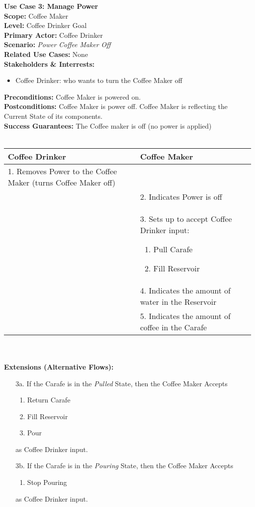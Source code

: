 \documentclass[letterpaper]{article}
\begin{document}
\noindent
\textbf{Use Case 3: Manage Power}\\
\textbf{Scope:  }Coffee Maker\\
\textbf{Level:  }Coffee Drinker Goal\\
\textbf{Primary Actor:  }Coffee Drinker\\
\textbf{Scenario:  }\textit{Power Coffee Maker Off}\\
\textbf{Related Use Cases:  }None\\
\textbf{Stakeholders \& Interrests:  }
\begin{itemize}
\item Coffee Drinker:  who wants to turn the Coffee Maker off
\end{itemize}
\textbf{Preconditions:  }Coffee Maker is powered on.\\
\textbf{Postconditions:  }Coffee Maker is power off.  Coffee Maker is
reflecting the Current State of its components.\\
\textbf{Success Guarantees:  }The Coffee maker is off (no power is
applied)\\\\
\begin{tabular}{|p{5.75cm}|p{5.75cm}|}\hline
\textbf{Coffee Drinker} & \textbf{Coffee Maker}\\\hline
1.  Removes Power to the Coffee Maker (turns Coffee Maker off) &
    \\\hline
& 2.  Indicates Power is off\\\hline
& 3.  Sets up to accept Coffee Drinker input: 
\begin{enumerate}
\item Pull Carafe
\item Fill Reservoir
\end{enumerate}
\\\hline
& 4.  Indicates the amount of water in the Reservoir\\\hline
& 5.  Indicates the amount of coffee in the Carafe\\\hline
\end{tabular}\\\\
\textbf{Extensions (Alternative Flows):}
\begin{itemize}
\item[3a.]If the Carafe is in the \textit{Pulled} State, then the
Coffee Maker Accepts
\begin{enumerate}
\item Return Carafe
\item Fill Reservoir
\item Pour
\end{enumerate}
as Coffee Drinker input.
\item[3b.]If the Carafe is in the \textit{Pouring} State, then the
Coffee Maker Accepts
\begin{enumerate}
\item Stop Pouring
\end{enumerate}
as Coffee Drinker input.
\end{itemize}
\end{document}
